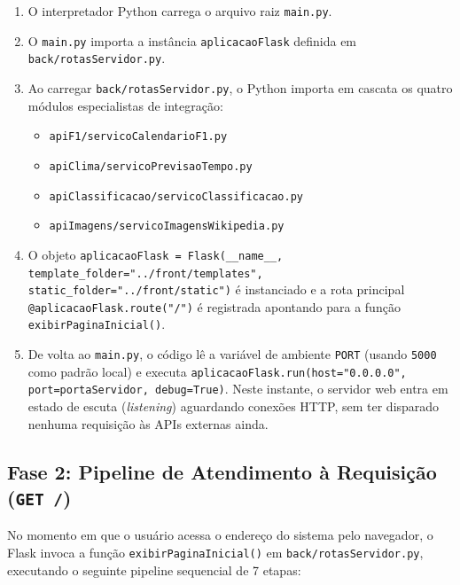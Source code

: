 \documentclass[12pt]{article}
\begin{document}
\begin{enumerate}
    \item O interpretador Python carrega o arquivo raiz \texttt{main.py}.
    \item O \texttt{main.py} importa a instância \texttt{aplicacaoFlask} definida em \texttt{back/rotasServidor.py}.
    \item Ao carregar \texttt{back/rotasServidor.py}, o Python importa em cascata os quatro módulos especialistas de integração:
    \begin{itemize}
        \item \texttt{apiF1/servicoCalendarioF1.py}
        \item \texttt{apiClima/servicoPrevisaoTempo.py}
        \item \texttt{apiClassificacao/servicoClassificacao.py}
        \item \texttt{apiImagens/servicoImagensWikipedia.py}
    \end{itemize}
    \item O objeto \texttt{aplicacaoFlask = Flask(\_\_name\_\_, template\_folder="../front/templates", static\_folder="../front/static")} é instanciado e a rota principal \texttt{@aplicacaoFlask.route("/")} é registrada apontando para a função \texttt{exibirPaginaInicial()}.
    \item De volta ao \texttt{main.py}, o código lê a variável de ambiente \texttt{PORT} (usando \texttt{5000} como padrão local) e executa \texttt{aplicacaoFlask.run(host="0.0.0.0", port=portaServidor, debug=True)}. Neste instante, o servidor web entra em estado de escuta (\textit{listening}) aguardando conexões HTTP, sem ter disparado nenhuma requisição às APIs externas ainda.
\end{enumerate}

\subsection{Fase 2: Pipeline de Atendimento à Requisição (\texttt{GET /})}

No momento em que o usuário acessa o endereço do sistema pelo navegador, o Flask invoca a função \texttt{exibirPaginaInicial()} em \texttt{back/rotasServidor.py}, executando o seguinte pipeline sequencial de 7 etapas:
\end{document}
